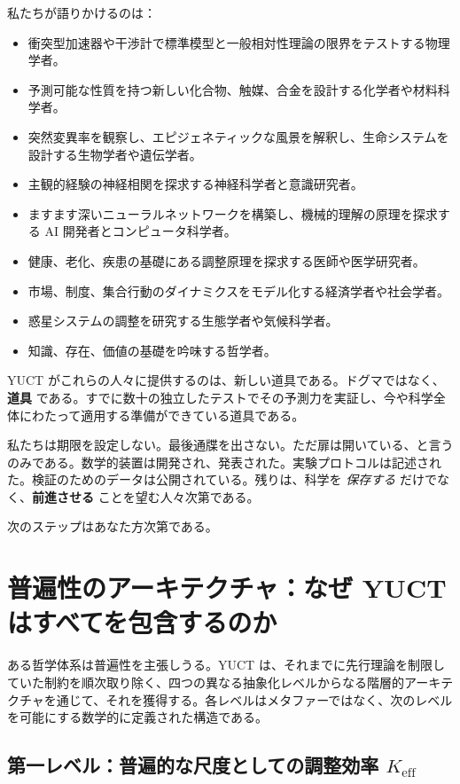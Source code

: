 \documentclass[12pt,a4paper]{article}
\begin{document}
	私たちが語りかけるのは：
	\begin{itemize}
		\item 衝突型加速器や干渉計で標準模型と一般相対性理論の限界をテストする物理学者。
		\item 予測可能な性質を持つ新しい化合物、触媒、合金を設計する化学者や材料科学者。
		\item 突然変異率を観察し、エピジェネティックな風景を解釈し、生命システムを設計する生物学者や遺伝学者。
		\item 主観的経験の神経相関を探求する神経科学者と意識研究者。
		\item ますます深いニューラルネットワークを構築し、機械的理解の原理を探求する AI 開発者とコンピュータ科学者。
		\item 健康、老化、疾患の基礎にある調整原理を探求する医師や医学研究者。
		\item 市場、制度、集合行動のダイナミクスをモデル化する経済学者や社会学者。
		\item 惑星システムの調整を研究する生態学者や気候科学者。
		\item 知識、存在、価値の基礎を吟味する哲学者。
	\end{itemize}
	
	YUCT がこれらの人々に提供するのは、新しい道具である。ドグマではなく、\textbf{道具} である。すでに数十の独立したテストでその予測力を実証し、今や科学全体にわたって適用する準備ができている道具である。
	
	私たちは期限を設定しない。最後通牒を出さない。ただ扉は開いている、と言うのみである。数学的装置は開発され、発表された。実験プロトコルは記述された。検証のためのデータは公開されている。残りは、科学を \emph{保存する} だけでなく、\textbf{前進させる} ことを望む人々次第である。
	
	次のステップはあなた方次第である。
	
	\section{普遍性のアーキテクチャ：なぜ YUCT はすべてを包含するのか}
	\label{sec:architecture-of-universality}
	
	ある哲学体系は普遍性を主張しうる。YUCT は、それまでに先行理論を制限していた制約を順次取り除く、四つの異なる抽象化レベルからなる階層的アーキテクチャを通じて、それを獲得する。各レベルはメタファーではなく、次のレベルを可能にする数学的に定義された構造である。
	
	\subsection{第一レベル：普遍的な尺度としての調整効率 \(K_{\mathrm{eff}}\)}
	
\end{document}
